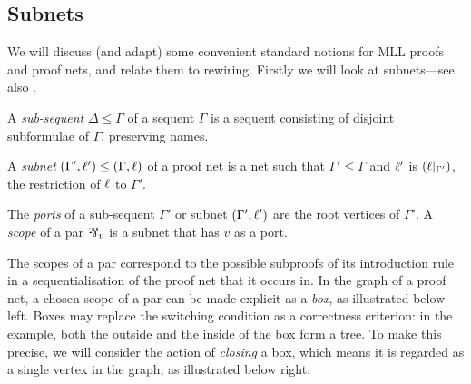\documentclass{sigplanconf}
\let\aftersubsection=\noindent
\let\capsabbrev=\uppercase
\begin{document}


\subsection*{Subnets}

\aftersubsection
We will discuss (and adapt) some convenient standard notions for \capsabbrev{mll} proofs and proof nets, and relate them to rewiring.
%
Firstly we will look at subnets---see also \cite{Bellin-vandeWiele-1995}.


\begin{definition}
A \emph{sub-sequent} $\Delta\leq\Gamma$ of a sequent $\Gamma$ is a sequent consisting of disjoint subformulae of $\Gamma$, preserving names.
\end{definition}

\begin{definition}
A \emph{subnet} $(\Gamma',\ell') \leq (\Gamma,\ell)$ of a proof net is a net such that $\Gamma'\leq\Gamma$ and $\ell'$ is $(\ell|_{\Gamma'})$, the restriction of $\ell$ to $\Gamma'$.
\end{definition}



The \emph{ports} of a sub-sequent $\Gamma'$ or subnet $(\Gamma',\ell')$ are the root vertices of $\Gamma'$.
%
%
A \emph{scope} of a par $\named v\parr$ is a subnet that has $v$ as a port.


The scopes of a par correspond to the possible subproofs of its introduction rule in a sequentialisation of the proof net that it occurs in.
%
\color{red}
In the graph of a proof net, a chosen scope of a par can be made explicit as a \emph{box}, as illustrated below left.
%
Boxes may replace the switching condition as a correctness criterion: in the example, both the outside and the inside of the box form a tree.
%
To make this precise, we will consider the action of \emph{closing} a box, which means it is regarded as a single vertex in the graph, as illustrated below right.
\end{document}
